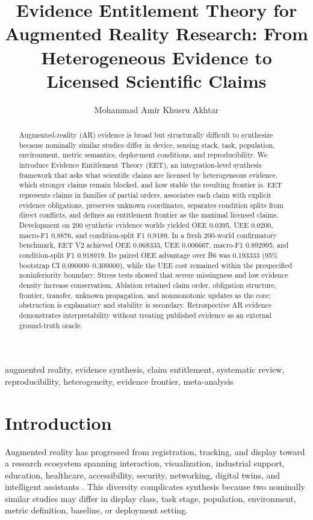 \documentclass[journal]{IEEEtran}
\title{Evidence Entitlement Theory for Augmented Reality Research: From Heterogeneous Evidence to Licensed Scientific Claims}
\author{Mohammad Amir Khusru Akhtar}
\begin{document}
\maketitle
\begin{abstract}
Augmented-reality (AR) evidence is broad but structurally difficult to synthesize because nominally similar studies differ in device, sensing stack, task, population, environment, metric semantics, deployment conditions, and reproducibility. We introduce Evidence Entitlement Theory (EET), an integration-level synthesis framework that asks what scientific claims are licensed by heterogeneous evidence, which stronger claims remain blocked, and how stable the resulting frontier is. EET represents claims in families of partial orders, associates each claim with explicit evidence obligations, preserves unknown coordinates, separates condition splits from direct conflicts, and defines an entitlement frontier as the maximal licensed claims. Development on 200 synthetic evidence worlds yielded OEE 0.0395, UEE 0.0200, macro-F1 0.8876, and condition-split F1 0.9189. In a fresh 200-world confirmatory benchmark, EET V2 achieved OEE 0.068333, UEE 0.006667, macro-F1 0.892995, and condition-split F1 0.918919. Its paired OEE advantage over B6 was 0.193333 (95\% bootstrap CI 0.090000--0.300000), while the UEE cost remained within the prespecified noninferiority boundary. Stress tests showed that severe missingness and low evidence density increase conservatism. Ablation retained claim order, obligation structure, frontier, transfer, unknown propagation, and nonmonotonic updates as the core; obstruction is explanatory and stability is secondary. Retrospective AR evidence demonstrates interpretability without treating published evidence as an external ground-truth oracle.
\end{abstract}
\begin{IEEEkeywords}augmented reality, evidence synthesis, claim entitlement, systematic review, reproducibility, heterogeneity, evidence frontier, meta-analysis\end{IEEEkeywords}

\section{Introduction}
Augmented reality has progressed from registration, tracking, and display toward a research ecosystem spanning interaction, visualization, industrial support, education, healthcare, accessibility, security, networking, digital twins, and intelligent assistants \cite{Azuma1997Survey,Azuma2001Advances,Billinghurst2015Survey,Sereno2022Collaborative,Macedo2023Occlusion}. This diversity complicates synthesis because two nominally similar studies may differ in display class, task stage, population, environment, metric definition, baseline, or deployment setting.
\end{document}
